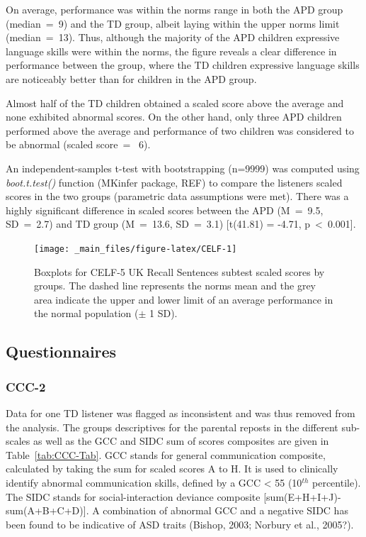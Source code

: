 \documentclass[a4paper, twoside]{templates/ociamthesis}
\begin{document}
On average, performance was within the norms range in both the APD group (median~=~9) and the TD group, albeit laying within the upper norms limit (median~=~13). Thus, although the majority of the APD children expressive language skills were within the norms, the figure reveals a clear difference in performance between the group, where the TD children expressive language skills are noticeably better than for children in the APD group.

Almost half of the TD children obtained a scaled score above the average and none exhibited abnormal scores. On the other hand, only three APD children performed above the average and performance of two children was considered to be abnormal (scaled score~= ~6).

An independent-samples t-test with bootstrapping (n=9999) was computed using \emph{boot.t.test()} function (MKinfer package, REF) to compare the listeners scaled scores in the two groups (parametric data assumptions were met). There was a highly significant difference in scaled scores between the APD (M~=~9.5, SD~=~2.7) and TD group (M~=~13.6, SD~=~3.1) {[}t(41.81) = -4.71, p~\textless~0.001{]}.

\begin{figure}

{\centering \texttt{[image: \_main\_files/figure-latex/CELF-1]} 

}

\caption{Boxplots for CELF-5 UK Recall Sentences subtest scaled scores by groups. The dashed line represents the norms mean and the grey area indicate the upper and lower limit of an average performance in the normal population ($\pm$ 1 SD).}\label{fig:CELF}
\end{figure}

\hypertarget{questionnaires-1}{%
\subsection{Questionnaires}\label{questionnaires-1}}

\hypertarget{ccc-2}{%
\subsubsection{CCC-2}\label{ccc-2}}

Data for one TD listener was flagged as inconsistent and was thus removed from the analysis. The groups descriptives for the parental reposts in the different sub-scales as well as the GCC and SIDC sum of scores composites are given in Table~\ref{tab:CCC-Tab}. GCC stands for general communication composite, calculated by taking the sum for scaled scores A to H. It is used to clinically identify abnormal communication skills, defined by a GCC \textless{} 55 (10\(^{th}\) percentile). The SIDC stands for social-interaction deviance composite {[}sum(E+H+I+J)-sum(A+B+C+D){]}. A combination of abnormal GCC and a negative SIDC has been found to be indicative of ASD traits (Bishop, 2003; Norbury et al., 2005?).
\end{document}
